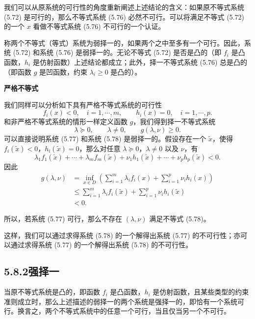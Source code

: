 \documentclass[UTF8,12pt,a4paper,fontset=fandol]{ctexart}
\begin{document}
我们可以从原系统的可行性的角度重新阐述上述结论的含义：如果原不等式系统 (5.72) 是可行的，那么不等式系统 (5.76) 必然不可行。可以将满足不等式 (5.72) 的一个 $x$ 看做不等式系统 (5.76) 不可行的一个认证。

称两个不等式（等式）系统为弱择一的，如果两个之中至多有一个可行。因此，系统 (5.72) 和系统 (5.76) 是弱择一的。无论不等式 (5.72) 是否是凸的（即 $f_i$ 是凸函数，$h_i$ 是仿射函数）上述结论都成立；此外，择一不等式系统 (5.76) 总是凸的（即函数 $g$ 是凹函数，约束 $\lambda_i\geq 0$ 是凸的）。

\noindent\textbf{严格不等式}

我们同样可以分析如下具有严格不等式系统的可行性
\begin{equation}
f_i(x)<0,\quad i=1,\cdots,m,\qquad h_i(x)=0,\quad i=1,\cdots,p.
\tag{5.77}
\end{equation}
和非严格不等式系统的情形一样定义函数 $g$，我们得到择一不等式系统
\begin{equation}
\lambda\succeq 0,\qquad \lambda\neq 0,\qquad g(\lambda,\nu)\geq 0.
\tag{5.78}
\end{equation}
可以直接说明系统 (5.77) 和系统 (5.78) 是弱择一的。假设存在一个 $\tilde{x}$，使得 $f_i(\tilde{x})<0$，$h_i(\tilde{x})=0$，那么对任意 $\lambda\succeq 0$，$\lambda\neq 0$ 以及 $\nu$，有
\[
\lambda_1f_1(\tilde{x})+\cdots+\lambda_m f_m(\tilde{x})+\nu_1h_1(\tilde{x})+\cdots+\nu_p h_p(\tilde{x})<0.
\]
因此
\[
\begin{aligned}
g(\lambda,\nu)
&=\inf_{x\in D}\left(\sum_{i=1}^m\lambda_i f_i(x)+\sum_{i=1}^p\nu_i h_i(x)\right)\\
&\leq \sum_{i=1}^m\lambda_i f_i(\tilde{x})+\sum_{i=1}^p\nu_i h_i(\tilde{x})\\
&<0.
\end{aligned}
\]

所以，若系统 (5.77) 可行，那么不存在 $(\lambda,\nu)$ 满足不等式 (5.78)。

这样，我们可以通过求得系统 (5.78) 的一个解得出系统 (5.77) 的不可行性；亦可以通过求得系统 (5.77) 的一个解得出系统 (5.78) 的不可行性。

\subsection*{5.8.2\quad 强择一}

当原不等式系统是凸的，即函数 $f_i$ 是凸函数，$h_i$ 是仿射函数，且某些类型的约束准则成立时，那么上述描述的弱择一的两个系统是强择一的，即恰有一个系统可行。换言之，两个不等式系统中的任意一个可行，当且仅当另一个不可行。
\end{document}
